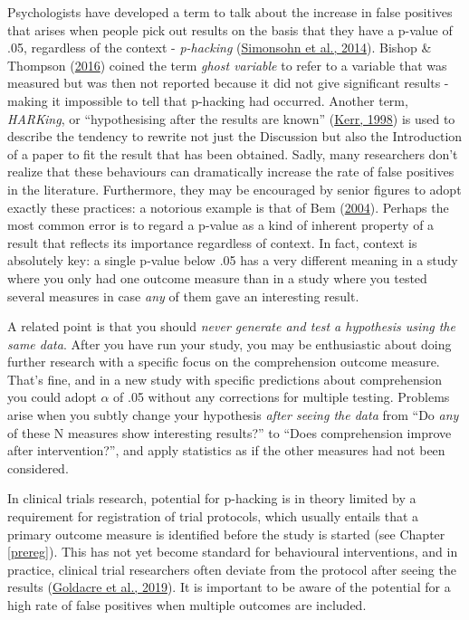 \documentclass{krantz}
\begin{document}
Psychologists have developed a term to talk about the increase in false positives that arises when people pick out results on the basis that they have a p-value of .05, regardless of the context - \emph{p-hacking} (\protect\hyperlink{ref-simonsohn2014a}{Simonsohn et al., 2014}). Bishop \& Thompson (\protect\hyperlink{ref-bishop2016}{2016}) coined the term \emph{ghost variable} to refer to a variable that was measured but was then not reported because it did not give significant results - making it impossible to tell that p-hacking had occurred. Another term, \emph{HARKing}, or ``hypothesising after the results are known'' (\protect\hyperlink{ref-kerr1998}{Kerr, 1998}) is used to describe the tendency to rewrite not just the Discussion but also the Introduction of a paper to fit the result that has been obtained. Sadly, many researchers don't realize that these behaviours can dramatically increase the rate of false positives in the literature. Furthermore, they may be encouraged by senior figures to adopt exactly these practices: a notorious example is that of Bem (\protect\hyperlink{ref-bem2004}{2004}). Perhaps the most common error is to regard a p-value as a kind of inherent property of a result that reflects its importance regardless of context. In fact, context is absolutely key: a single p-value below .05 has a very different meaning in a study where you only had one outcome measure than in a study where you tested several measures in case \emph{any} of them gave an interesting result.

A related point is that you should \emph{never generate and test a hypothesis using the same data}. After you have run your study, you may be enthusiastic about doing further research with a specific focus on the comprehension outcome measure. That's fine, and in a new study with specific predictions about comprehension you could adopt \(\alpha\) of .05 without any corrections for multiple testing. Problems arise when you subtly change your hypothesis \emph{after seeing the data} from ``Do \emph{any} of these N measures show interesting results?'' to ``Does comprehension improve after intervention?'', and apply statistics as if the other measures had not been considered.

In clinical trials research, potential for p-hacking is in theory limited by a requirement for registration of trial protocols, which usually entails that a primary outcome measure is identified before the study is started (see Chapter \ref{prereg}). This has not yet become standard for behavioural interventions, and in practice, clinical trial researchers often deviate from the protocol after seeing the results (\protect\hyperlink{ref-goldacre2019}{Goldacre et al., 2019}). It is important to be aware of the potential for a high rate of false positives when multiple outcomes are included.
\end{document}
